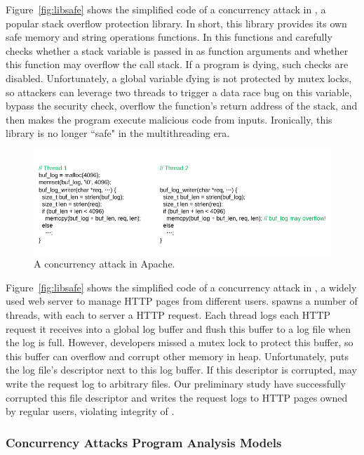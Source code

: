 Figure~\ref{fig:libsafe} shows the simplified code of a concurrency attack in 
\libsafe, a popular stack overflow protection library. In short, this library 
provides its own safe memory and string operations functions. In this 
functions and carefully checks whether a stack variable is passed in as 
function arguments and whether this function may overflow the call stack. If a 
program is dying, such checks are disabled. Unfortunately, a global variable 
\v{dying} is not protected by mutex locks, so attackers can leverage two 
threads to trigger a data race bug on this variable, bypass the security 
check, overflow the function's return address of the stack, and then makes the 
program execute malicious code from inputs. Ironically, this \libsafe library 
is no longer ``safe" in the multithreading era.

\begin{figure}[h]
\centering
\includegraphics[width=0.8\columnwidth]{figures/apache}
\vspace{-.05in}
\caption{{A concurrency attack in Apache.}} \label{fig:apache}
\vspace{-.05in}
\end{figure}

Figure~\ref{fig:libsafe} shows the simplified code of a concurrency attack in 
\apache, a widely used web server to manage HTTP pages from different users. 
\apache spawns a number of threads, with each to server a HTTP request. Each 
thread logs each HTTP request it receives into a global log buffer and flush 
this buffer to a log file when the log is full. However, developers missed a 
mutex lock to protect this buffer, so this buffer can overflow and corrupt 
other memory in heap. Unfortunately, \apache puts the log file's descriptor next 
to this log buffer. If this descriptor is corrupted, \apache may write the 
request log to arbitrary files. Our preliminary study have successfully 
corrupted this file descriptor and writes the request logs to HTTP pages owned 
by regular users, violating integrity of \apache.



\vspace{-.15in}\subsubsection{Concurrency Attacks Program Analysis Models} 
\label{sec:attack-phase}\vspace{-.075in}

